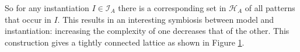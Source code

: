 \documentclass{llncs}
\begin{document}
\noindent So for any instantiation ${I}\in \mathcal{I}_A$ there is a corresponding set in $\mathcal{H}_A$ of all patterns that occur in ${I}$. This results in an interesting symbiosis between model and instantiation: increasing the complexity of one decreases that of the other. This construction gives a tightly connected lattice as shown in Figure \ref{lattice}. 

\begin{figure}[t]

\label{lattice}
\end{figure}


\end{document}
